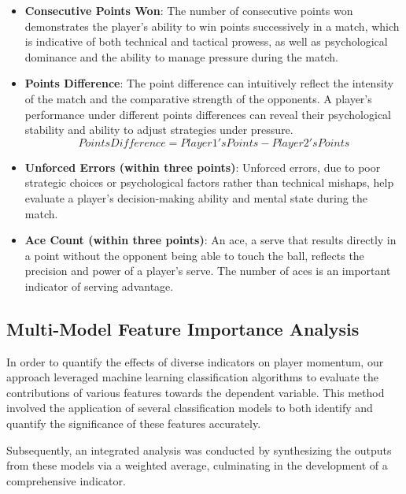 \documentclass{mcmthesis}
\begin{document}
\begin{itemize}
\begin{equation}
          \end{equation}
    \item {\bf Consecutive Points Won}: The number of consecutive points won demonstrates the player's ability to win points successively in a match, which is indicative of both technical and tactical prowess, as well as psychological dominance and the ability to manage pressure during the match.
    \item {\bf Points Difference}: The point difference can intuitively reflect the intensity of the match and the comparative strength of the opponents. A player's performance under different points differences can reveal their psychological stability and ability to adjust strategies under pressure.
          \begin{equation} \label{eq1}
              Points Difference = Player1's Points - Player2's Points
          \end{equation}
    \item {\bf Unforced Errors (within three points)}: Unforced errors, due to poor strategic choices or psychological factors rather than technical mishaps, help evaluate a player's decision-making ability and mental state during the match.
    \item {\bf Ace Count (within three points)}: An ace, a serve that results directly in a point without the opponent being able to touch the ball, reflects the precision and power of a player's serve. The number of aces is an important indicator of serving advantage.
\end{itemize}

\subsection{Multi-Model Feature Importance Analysis}
In order to quantify the effects of diverse indicators on player momentum, our approach leveraged machine learning classification algorithms to evaluate the contributions of various features towards the dependent variable. This method involved the application of several classification models to both identify and quantify the significance of these features accurately.

Subsequently, an integrated analysis was conducted by synthesizing the outputs from these models via a weighted average, culminating in the development of a comprehensive indicator.
\end{document}
